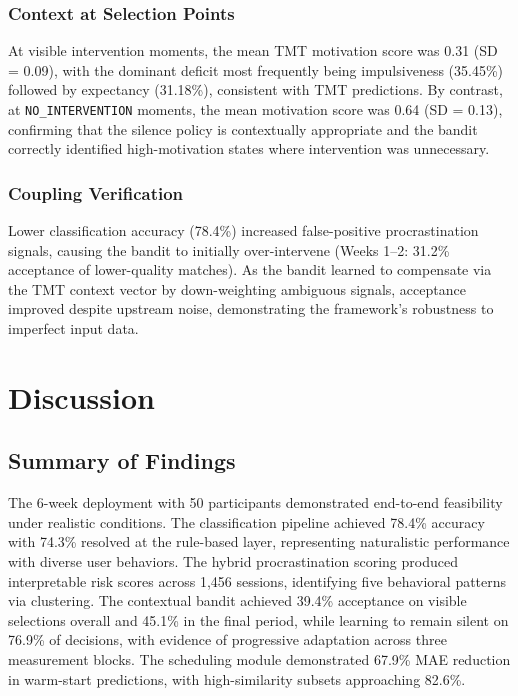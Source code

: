 \documentclass[conference]{IEEEtran}
\begin{document}
\subsubsection{Context at Selection Points}
At visible intervention moments, the mean TMT motivation score was 0.31 (SD = 0.09), with the dominant deficit most frequently being impulsiveness (35.45\%) followed by expectancy (31.18\%), consistent with TMT predictions. By contrast, at \texttt{NO\_INTERVENTION} moments, the mean motivation score was 0.64 (SD = 0.13), confirming that the silence policy is contextually appropriate and the bandit correctly identified high-motivation states where intervention was unnecessary.

\subsubsection{Coupling Verification}
Lower classification accuracy (78.4\%) increased false-positive procrastination signals, causing the bandit to initially over-intervene (Weeks 1--2: 31.2\% acceptance of lower-quality matches). As the bandit learned to compensate via the TMT context vector by down-weighting ambiguous signals, acceptance improved despite upstream noise, demonstrating the framework's robustness to imperfect input data.

\section{Discussion}

\subsection{Summary of Findings}
The 6-week deployment with 50 participants demonstrated end-to-end feasibility under realistic conditions. The classification pipeline achieved 78.4\% accuracy with 74.3\% resolved at the rule-based layer, representing naturalistic performance with diverse user behaviors. The hybrid procrastination scoring produced interpretable risk scores across 1{,}456 sessions, identifying five behavioral patterns via clustering. The contextual bandit achieved 39.4\% acceptance on visible selections overall and 45.1\% in the final period, while learning to remain silent on 76.9\% of decisions, with evidence of progressive adaptation across three measurement blocks. The scheduling module demonstrated 67.9\% MAE reduction in warm-start predictions, with high-similarity subsets approaching 82.6\%.
\end{document}
